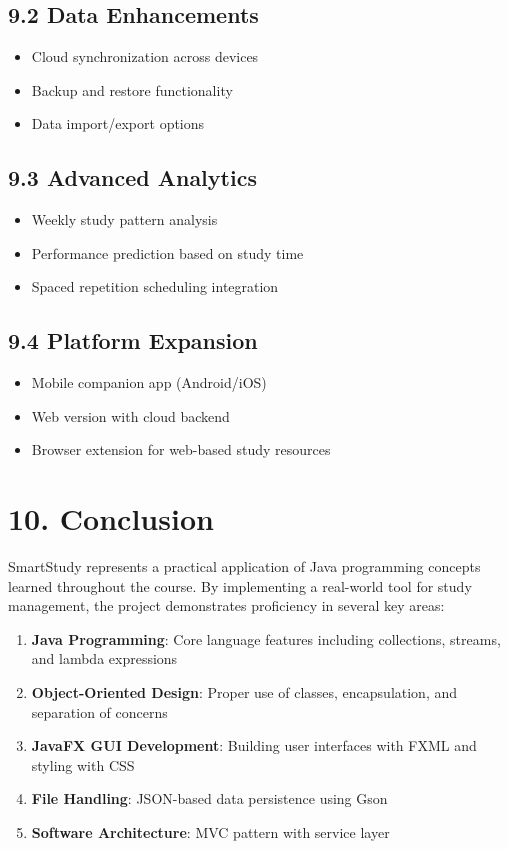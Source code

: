 \documentclass[12pt,a4paper]{article}
\begin{document}
\subsection{9.2 Data Enhancements}
\begin{itemize}
    \item Cloud synchronization across devices
    \item Backup and restore functionality
    \item Data import/export options
\end{itemize}

\subsection{9.3 Advanced Analytics}
\begin{itemize}
    \item Weekly study pattern analysis
    \item Performance prediction based on study time
    \item Spaced repetition scheduling integration
\end{itemize}

\subsection{9.4 Platform Expansion}
\begin{itemize}
    \item Mobile companion app (Android/iOS)
    \item Web version with cloud backend
    \item Browser extension for web-based study resources
\end{itemize}

\section{10. Conclusion}

SmartStudy represents a practical application of Java programming concepts learned throughout the course. By implementing a real-world tool for study management, the project demonstrates proficiency in several key areas:

\begin{enumerate}
    \item \textbf{Java Programming}: Core language features including collections, streams, and lambda expressions
    \item \textbf{Object-Oriented Design}: Proper use of classes, encapsulation, and separation of concerns
    \item \textbf{JavaFX GUI Development}: Building user interfaces with FXML and styling with CSS
    \item \textbf{File Handling}: JSON-based data persistence using Gson
    \item \textbf{Software Architecture}: MVC pattern with service layer
\end{enumerate}
\end{document}
